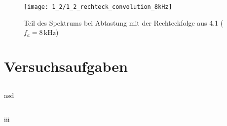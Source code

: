 \documentclass[a4paper, 12pt]{article}
\begin{document}
\begin{figure}[H]
	\texttt{[image: 1\_2/1\_2\_rechteck\_convolution\_8kHz]}
  \caption{Teil des Spektrums bei Abtastung mit der Rechteckfolge aus 4.1 ($f_a = 8 \,\si{\kilo\hertz}$)}
\end{figure}


\section{Versuchsaufgaben}

\subsection{}
asd
\subsection{}
iii

\subsection{}
\end{document}
